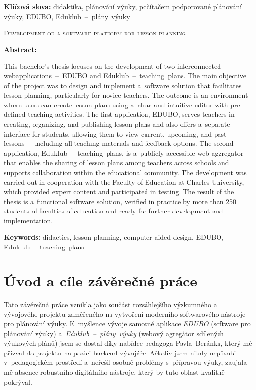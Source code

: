 \documentclass[male,czech,api_bc]{kitheses}
\newcommand{\nazeven}{Development of a software platform for lesson planning}       %
\begin{document}
\textbf{Klíčová slova:} didaktika, plánování výuky, počítačem podporované plánování výuky, EDUBO, Eduklub~--~plány~výuky

\bigskip


\textsc{\nazeven}

\textbf{Abstract:}

This bachelor's thesis focuses on the development of two interconnected web\break applications~--~EDUBO and Eduklub~--~teaching~plans. The main objective of the project was to design and implement a~software solution that facilitates lesson planning, particularly for novice teachers. The outcome is an environment where users can create lesson plans using a~clear and intuitive editor with pre-defined teaching activities. The first application, EDUBO, serves teachers in creating, organizing, and publishing lesson plans and also offers a~separate interface for students, allowing them to view current, upcoming, and past lessons~--~including all teaching materials and feedback options. The second application, Eduklub~--~teaching~plans, is a~publicly accessible web aggregator that enables the sharing of lesson plans among teachers across schools and supports collaboration within the educational community. The development was carried out in cooperation with the Faculty of Education at Charles University, which provided expert content and participated in testing. The result of the thesis is a~functional software solution, verified in practice by more than 250 students of faculties of education and ready for further development and implementation.

\textbf{Keywords:} didactics, lesson planning, computer-aided design, EDUBO, Eduklub~--~teaching~plans

\tableofcontents

\chapter{Úvod a cíle závěrečné práce}

Tato závěrečná práce vznikla jako součást rozsáhlejšího výzkumného a vývojového projektu zaměřeného na vytvoření moderního softwarového nástroje pro plánování výuky. K~myšlence vývoje samotné aplikace \textit{EDUBO} (software pro plánování výuky) a~\textit{Eduklub~--~plány~výuky} (webový agregátor sdílených výukových plánů) jsem se dostal díky nabídce pedagoga Pavla~Beránka, který mě přizval do projektu na pozici backend vývojáře. Ačkoliv jsem nikdy nepůsobil v~pedagogickém prostředí a~neřešil osobně problémy s~přípravou výuky, zaujala mě absence robustního digitálního nástroje, který by tuto oblast kvalitně pokrýval.
\end{document}
